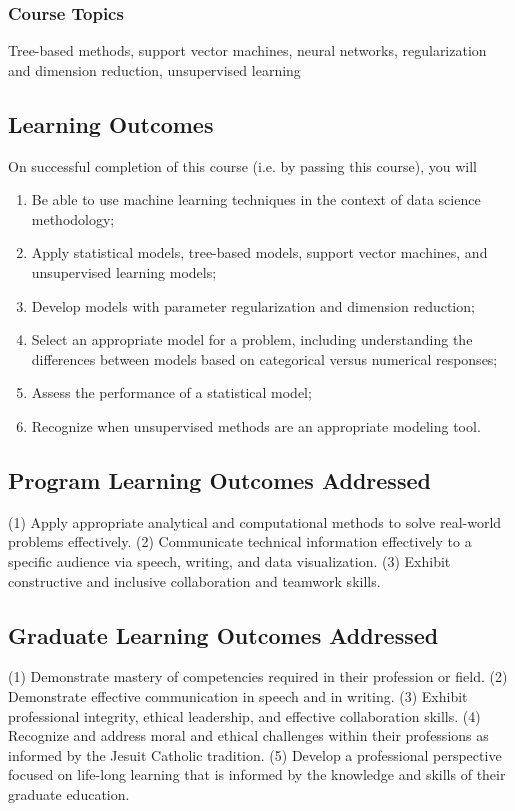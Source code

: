 \documentclass[16pt]{article}
\begin{document}
	\subsubsection*{Course Topics} Tree-based methods, support vector machines, neural networks, regularization and dimension reduction, unsupervised learning
	
	
	
	\subsection*{Learning Outcomes}
	
	On successful completion of this course (i.e. by passing this course), you will 
	\begin{enumerate}
		\setlength{\itemsep}{-1pt}
		\item	Be able to use machine learning techniques in the context of data science methodology;
		\item	Apply statistical models, tree-based models, support vector machines, and unsupervised learning models;
		\item	Develop models with parameter regularization and dimension reduction;
		\item	Select an appropriate model for a problem, including understanding the differences between models based on categorical versus numerical responses;
		\item	Assess the performance of a statistical model;
		\item	Recognize when unsupervised methods are an appropriate modeling tool.
	\end{enumerate}
	
	\subsection*{Program Learning Outcomes Addressed }
	
	(1)	Apply appropriate analytical and computational methods to solve real-world problems effectively.
	(2)	Communicate technical information effectively to a specific audience via speech, writing, and data visualization.
	(3)	Exhibit constructive and inclusive collaboration and teamwork skills.
	
	
	\subsection*{Graduate Learning Outcomes Addressed}
	
	(1)	Demonstrate mastery of competencies required in their profession or field.
	(2)	Demonstrate effective communication in speech and in writing.
	(3)	Exhibit professional integrity, ethical leadership, and effective collaboration skills.
	(4)	Recognize and address moral and ethical challenges within their professions as informed by the Jesuit Catholic tradition.
	(5)	Develop a professional perspective focused on life-long learning that is informed by the knowledge and skills of their graduate education.
\end{document}
